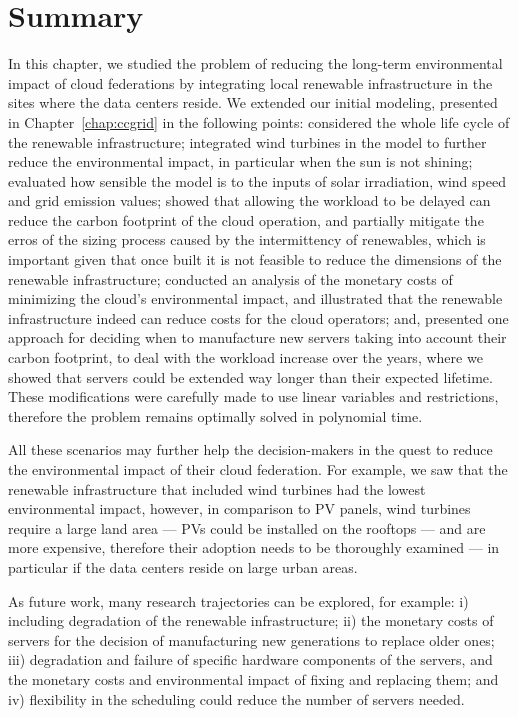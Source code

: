 \section{Summary}

\label{sec:long_term_conclusion}

In this chapter, we studied the problem of reducing the long-term environmental impact of cloud federations by integrating local renewable infrastructure in the sites where the data centers reside. We extended our initial modeling, presented in Chapter~\ref{chap:ccgrid} in the following points: considered the whole life cycle of the renewable infrastructure; integrated wind turbines in the model to further reduce the environmental impact, in particular when the sun is not shining;  evaluated how sensible the model is to the inputs of solar irradiation, wind speed and grid emission values; showed that allowing the workload to be delayed can reduce the carbon footprint of the cloud operation, and partially mitigate the erros of the sizing process caused by the intermittency of renewables, which is important given that once built it is not feasible to reduce the dimensions of the renewable infrastructure;  conducted an analysis of the monetary costs of minimizing the cloud's  environmental impact, and illustrated that the renewable infrastructure indeed can reduce costs for the cloud operators; and, presented one approach for deciding when to manufacture new servers taking into account their carbon footprint, to deal with the workload increase over the years, where we showed that servers could be extended way longer than their expected lifetime. These modifications were carefully made to use linear variables and restrictions, therefore the problem remains optimally solved in polynomial time.


All these scenarios may further help the decision-makers in the quest to reduce the environmental impact of their cloud federation. For example, we saw that the renewable infrastructure that included wind turbines had the lowest environmental impact, however, in comparison to PV panels, wind turbines require a large land area --- PVs could be installed on the rooftops --- and are more expensive, therefore their adoption needs to be thoroughly examined --- in particular if the data centers reside on large urban areas. 


As future work, many research trajectories can be explored, for example: i) including degradation of the renewable infrastructure; ii) the monetary costs of servers for the decision of manufacturing new generations to replace older ones; iii) degradation and failure of specific hardware components of the servers, and the monetary costs and environmental impact of fixing and replacing them; and iv) flexibility in the scheduling could reduce the number of servers needed.